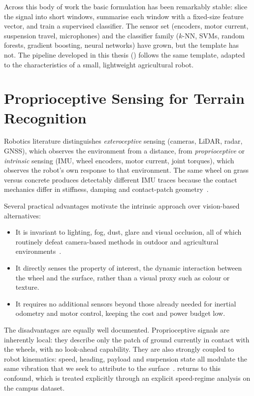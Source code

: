 Across this body of work the basic formulation has been remarkably stable: slice the signal into short windows, summarise each window with a fixed-size feature vector, and train a supervised classifier. The sensor set (encoders, motor current, suspension travel, microphones) and the classifier family ($k$-NN, SVMs, random forests, gradient boosting, neural networks) have grown, but the template has not. The pipeline developed in this thesis () follows the same template, adapted to the characteristics of a small, lightweight agricultural robot.



\section{Proprioceptive Sensing for Terrain Recognition}
\label{sec:bg-proprio}

Robotics literature distinguishes \emph{exteroceptive} sensing (cameras, LiDAR, radar, GNSS), which observes the environment from a distance, from \emph{proprioceptive} or \emph{intrinsic} sensing (IMU, wheel encoders, motor current, joint torques), which observes the robot's own response to that environment. The same wheel on grass versus concrete produces detectably different IMU traces because the contact mechanics differ in stiffness, damping and contact-patch geometry~\cite{Iagnemma2004,Brooks2005}.

Several practical advantages motivate the intrinsic approach over vision-based alternatives:
\begin{itemize}
    \item It is invariant to lighting, fog, dust, glare and visual occlusion, all of which routinely defeat camera-based methods in outdoor and agricultural environments~\cite{Reina2016}.
    \item It directly senses the property of interest, the dynamic interaction between the wheel and the surface, rather than a visual proxy such as colour or texture.
    \item It requires no additional sensors beyond those already needed for inertial odometry and motor control, keeping the cost and power budget low.
\end{itemize}

The disadvantages are equally well documented. Proprioceptive signals are inherently local: they describe only the patch of ground currently in contact with the wheels, with no look-ahead capability. They are also strongly coupled to robot kinematics: speed, heading, payload and suspension state all modulate the same vibration that we seek to attribute to the surface~\cite{Bermudez2012,Coyle2008}.  returns to this confound, which is treated explicitly through an explicit speed-regime analysis on the campus dataset.

